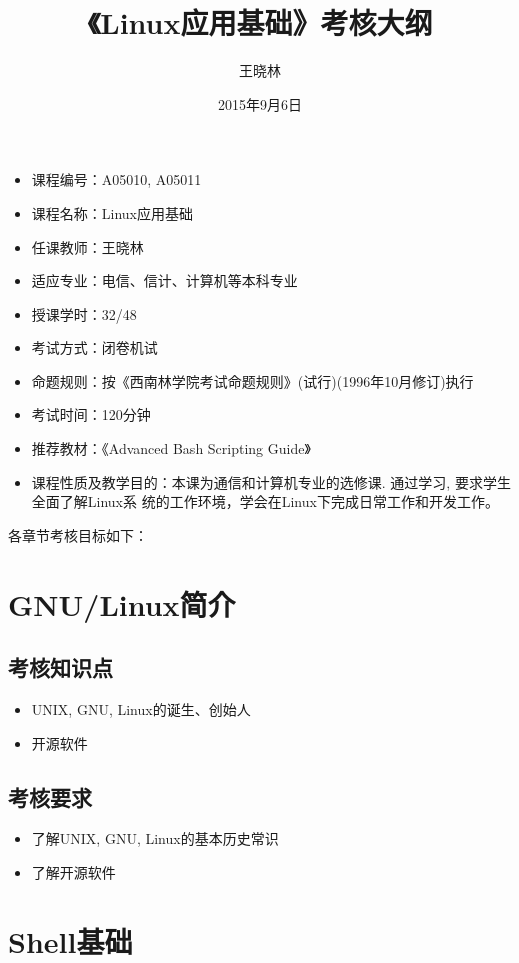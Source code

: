 \documentclass[12pt,a4paper]{article}
\title{《Linux应用基础》考核大纲}
\author{王晓林}
\date{2015年9月6日}
\begin{document}
\maketitle

\begin{itemize}
\item 课程编号：A05010, A05011  
\item 课程名称：Linux应用基础
\item 任课教师：王晓林
\item 适应专业：电信、信计、计算机等本科专业
\item 授课学时：32/48
\item 考试方式：闭卷机试
\item 命题规则：按《西南林学院考试命题规则》(试行)(1996年10月修订)执行
\item 考试时间：120分钟
\item 推荐教材：《Advanced Bash Scripting Guide》
\item 课程性质及教学目的：本课为通信和计算机专业的选修课. 通过学习, 要求学生全面了解Linux系
  统的工作环境，学会在Linux下完成日常工作和开发工作。
\end{itemize}
  
各章节考核目标如下：
\clearpage

\section{GNU/Linux简介}

\subsection{考核知识点}

\begin{itemize}
\item UNIX, GNU, Linux的诞生、创始人
\item 开源软件
\end{itemize}

\subsection{考核要求}

\begin{itemize}
\item 了解UNIX, GNU, Linux的基本历史常识
\item 了解开源软件
\end{itemize}

\section{Shell基础}
\end{document}
